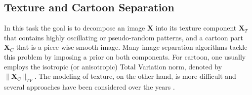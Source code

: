 \documentclass[10pt,twocolumn,letterpaper]{article}
\def\X{{\mathbf X}}
\begin{document}
\subsection{Texture and Cartoon Separation} \label{Sec:separation}
In this task the goal is to decompose an image $\X$ into its texture component $\X_T$ that contains highly oscillating or pseudo-random patterns, and a cartoon part $\X_C$ that is a piece-wise smooth image. Many image separation algorithms tackle this problem by imposing a prior on both components. For cartoon, one usually employs the isotropic (or anisotropic) Total Variation norm, denoted by $\| \X_C \|_{TV}$. The modeling of texture, on the other hand, is more difficult and several approaches have been considered over the years \cite{elad2005simultaneous,aujol2006structure,ono2014cartoon,zhangconvolutional}.
\end{document}
